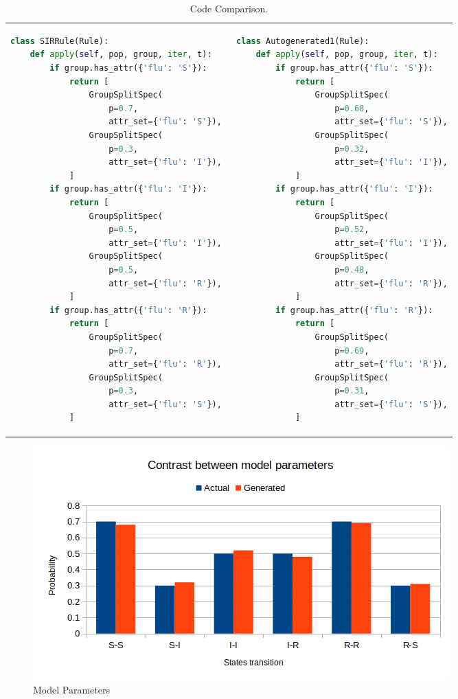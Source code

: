 \documentclass[11pt, a4paper]{article} %
\begin{document}
\FloatBarrier
\begin{table}[h!]

\caption{\label{} Code Comparison.}
\begin{tabular}{@{}p{}%
		| p{}@{}}
	
	\begin{lstlisting}[language=Python, caption = {Actual Rule}, label = actualrule]
class SIRRule(Rule):
	def apply(self, pop, group, iter, t):
		if group.has_attr({'flu': 'S'}):
			return [
				GroupSplitSpec(
					p=0.7, 
					attr_set={'flu': 'S'}),
				GroupSplitSpec(
					p=0.3,
					attr_set={'flu': 'I'}),
			]
		if group.has_attr({'flu': 'I'}):
			return [
				GroupSplitSpec(
					p=0.5,
					attr_set={'flu': 'I'}),
				GroupSplitSpec(
					p=0.5,
					attr_set={'flu': 'R'}), 
			]
		if group.has_attr({'flu': 'R'}):
			return [
				GroupSplitSpec(
					p=0.7,
					attr_set={'flu': 'R'}),
				GroupSplitSpec(
					p=0.3,
					attr_set={'flu': 'S'}), 
			]
	\end{lstlisting}
	&
	\begin{lstlisting}[language=Python, caption = {Generated Rule}, label = rule]
class Autogenerated1(Rule):
	def apply(self, pop, group, iter, t):
		if group.has_attr({'flu': 'S'}):
			return [
				GroupSplitSpec(
					p=0.68,
					attr_set={'flu': 'S'}),
				GroupSplitSpec(
					p=0.32,
					attr_set={'flu': 'I'}),
			]
		if group.has_attr({'flu': 'I'}):
			return [
				GroupSplitSpec(
					p=0.52,
					attr_set={'flu': 'I'}),
				GroupSplitSpec(
					p=0.48,
					attr_set={'flu': 'R'}),
			]
		if group.has_attr({'flu': 'R'}):
			return [
				GroupSplitSpec(
					p=0.69,
					attr_set={'flu': 'R'}),
				GroupSplitSpec(
					p=0.31,
					attr_set={'flu': 'S'}),
			]
	\end{lstlisting}
	\label{lst:code}
\end{tabular}
\end{table}
\FloatBarrier

\begin{figure}[h!]
	\includegraphics[scale=1]{modelparams.png}
	\caption{Model Parameters}
	\label{fig:mod}
\end{figure}
\end{document}
